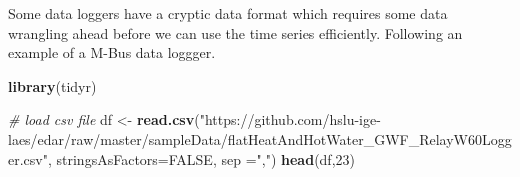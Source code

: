 \documentclass[
]{book}
\newenvironment{Shaded}{\begin{snugshade}}{\end{snugshade}}
\newcommand{\CommentTok}[1]{\textcolor[rgb]{0.56,0.35,0.01}{\textit{#1}}}
\newcommand{\DataTypeTok}[1]{\textcolor[rgb]{0.13,0.29,0.53}{#1}}
\newcommand{\DecValTok}[1]{\textcolor[rgb]{0.00,0.00,0.81}{#1}}
\newcommand{\KeywordTok}[1]{\textcolor[rgb]{0.13,0.29,0.53}{\textbf{#1}}}
\newcommand{\NormalTok}[1]{#1}
\newcommand{\OtherTok}[1]{\textcolor[rgb]{0.56,0.35,0.01}{#1}}
\newcommand{\StringTok}[1]{\textcolor[rgb]{0.31,0.60,0.02}{#1}}
\let\oldShaded\Shaded
\let\endoldShaded\endShaded
\renewenvironment{Shaded}{\footnotesize\oldShaded}{\endoldShaded}
\begin{document}
Some data loggers have a cryptic data format which requires some data wrangling ahead before we can use the time series efficiently. Following an example of a M-Bus data loggger.

\begin{Shaded}
\begin{Highlighting}[]
\KeywordTok{library}\NormalTok{(tidyr)}

\CommentTok{# load csv file}
\NormalTok{df <-}\StringTok{ }\KeywordTok{read.csv}\NormalTok{(}\StringTok{"https://github.com/hslu-ige-laes/edar/raw/master/sampleData/flatHeatAndHotWater_GWF_RelayW60Logger.csv"}\NormalTok{,}
               \DataTypeTok{stringsAsFactors=}\OtherTok{FALSE}\NormalTok{,}
               \DataTypeTok{sep =}\StringTok{","}\NormalTok{)}
\KeywordTok{head}\NormalTok{(df,}\DecValTok{23}\NormalTok{)}
\end{Highlighting}
\end{Shaded}
\end{document}
